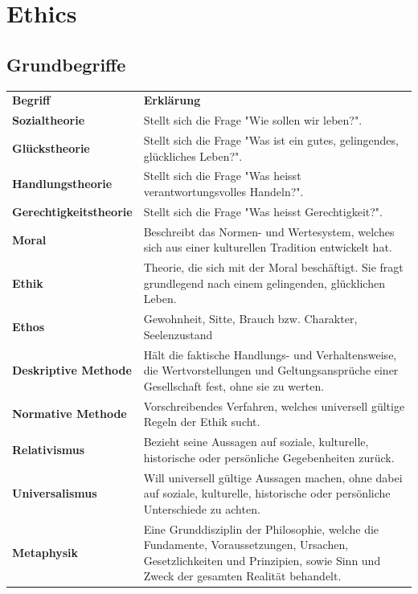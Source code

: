 \section{Ethics}
	\subsection{Grundbegriffe}
	
		\begin{longtable}{|>{\bfseries}p{}||p{}|}
			\hline
			Begriff
				& \textbf{Erklärung}\\
			\hhline{|=#=|}
			Sozialtheorie
				& Stellt sich die Frage "Wie sollen wir leben?".\\
			\hline
			Glückstheorie
				& Stellt sich die Frage "Was ist ein gutes, gelingendes, glückliches Leben?".\\
			\hline
			Handlungstheorie
				& Stellt sich die Frage "Was heisst verantwortungsvolles Handeln?".\\
			\hline
			Gerechtigkeitstheorie
				& Stellt sich die Frage "Was heisst Gerechtigkeit?".\\
			\hline
			Moral
				& Beschreibt das Normen- und Wertesystem, welches sich aus einer kulturellen Tradition entwickelt hat.\\
			\hline
			Ethik
				& Theorie, die sich mit der Moral beschäftigt. Sie fragt grundlegend nach einem gelingenden, glücklichen Leben.\\
			\hline
			Ethos
				& Gewohnheit, Sitte, Brauch bzw. Charakter, Seelenzustand\\
			\hline
			Deskriptive Methode
				& Hält die faktische Handlungs- und Verhaltensweise, die Wertvorstellungen und Geltungsansprüche einer Gesellschaft fest, ohne sie zu werten.\\
			\hline
			Normative Methode
				& Vorschreibendes Verfahren, welches universell gültige Regeln der Ethik sucht.\\
			\hline
			Relativismus
				& Bezieht seine Aussagen auf soziale, kulturelle, historische oder persönliche Gegebenheiten zurück.\\
			\hline
			Universalismus
				& Will universell gültige Aussagen machen, ohne dabei auf soziale, kulturelle, historische oder persönliche Unterschiede zu achten.\\
			\hline
			Metaphysik
				& Eine Grunddisziplin der Philosophie, welche die Fundamente, Voraussetzungen, Ursachen, Gesetzlichkeiten und Prinzipien, sowie Sinn und Zweck der gesamten Realität behandelt.\\

\end{longtable}

